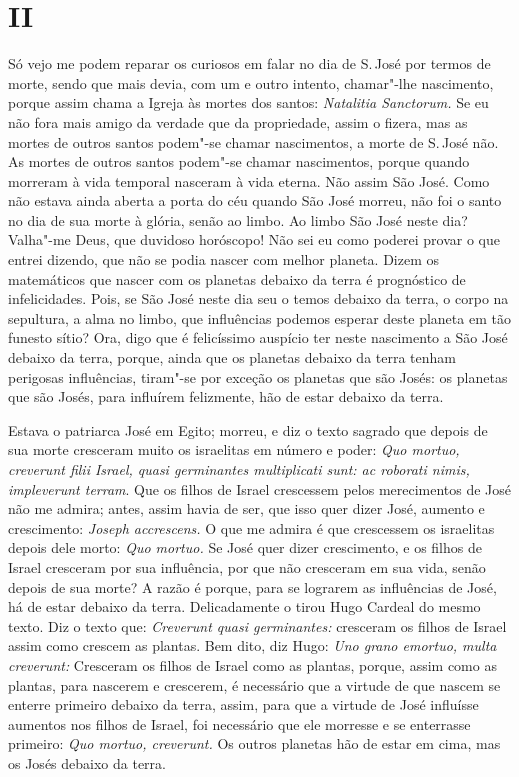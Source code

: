 \section{II}

Só vejo me podem reparar os curiosos em falar no dia de S.\,José por
termos de morte, sendo que mais devia, com um e outro intento,
chamar"-lhe nascimento, porque assim chama a Igreja às mortes dos santos:
\emph{Natalitia Sanctorum.} Se eu não fora mais amigo da verdade que
da propriedade, assim o fizera, mas as mortes de outros santos podem"-se
chamar nascimentos, a morte de S.\,José não. As mortes de outros santos
podem"-se chamar nascimentos, porque quando morreram à vida temporal nasceram à
vida eterna. Não assim São José. Como não estava ainda aberta a porta do
céu quando São José morreu, não foi o santo no dia de sua morte à
glória, senão ao limbo. Ao limbo São José neste dia? Valha"-me Deus, que
duvidoso horóscopo! Não sei eu como poderei provar o que entrei dizendo,
que não se podia nascer com melhor planeta. Dizem os matemáticos que nascer com
os planetas debaixo da terra é prognóstico de infelicidades.
Pois, se São José neste dia seu o temos debaixo da terra, o
corpo na sepultura, a alma no limbo, que influências podemos esperar
deste planeta em tão funesto sítio? Ora, digo que é felicíssimo auspício
ter neste nascimento a São José debaixo da terra, porque, ainda que os
planetas debaixo da terra tenham perigosas influências, tiram"-se por
exceção os planetas que são Josés: os planetas que são Josés, para
influírem felizmente, hão de estar debaixo da terra.

Estava o patriarca José em Egito; morreu, e diz o texto sagrado que
depois de sua morte cresceram muito os israelitas em número e poder:
\emph{Quo mortuo, creverunt filii Israel, quasi germinantes multiplicati
sunt: ac roborati nimis, impleverunt terram}. Que os filhos de
Israel crescessem pelos merecimentos de José não me admira; antes, assim
havia de ser, que isso quer dizer José, aumento e crescimento:
\emph{Joseph accrescens.} O que me admira é que crescessem os
israelitas depois dele morto: \emph{Quo mortuo.} Se José quer dizer
crescimento, e os filhos de Israel cresceram por sua influência, por que
não cresceram em sua vida, senão depois de sua morte? A razão é porque,
para se lograrem as influências de José, há de estar debaixo da terra.
Delicadamente o tirou Hugo Cardeal do mesmo texto. Diz o texto que:
\emph{Creverunt quasi germinantes:} cresceram os filhos de Israel assim
como crescem as plantas. Bem dito, diz Hugo: \emph{Uno grano emortuo,
multa creverunt:} Cresceram os filhos de Israel como as plantas, porque,
assim como as plantas, para nascerem e crescerem, é necessário que a
virtude de que nascem se enterre primeiro debaixo da terra, assim, para
que a virtude de José influísse aumentos nos filhos de Israel, foi
necessário que ele morresse e se enterrasse primeiro: \emph{Quo mortuo,
creverunt.} Os outros planetas hão de estar em cima, mas os Josés
debaixo da terra.


